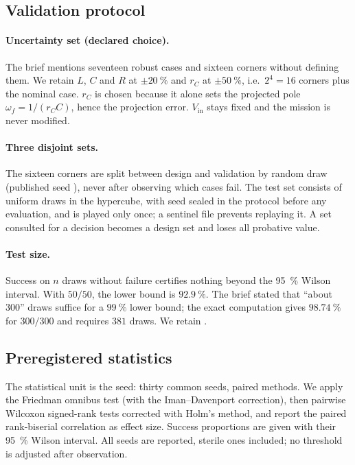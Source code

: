 \subsection{Validation protocol}

\paragraph{Uncertainty set (declared choice).}
The brief mentions seventeen robust cases and sixteen corners without
defining them. We retain $L$, $C$ and $R$ at $\pm20~\%$ and $r_C$ at
$\pm50~\%$, i.e.\ $2^4=16$ corners plus the nominal case. $r_C$ is chosen
because it alone sets the projected pole $\omega_f=1/(r_CC)$, hence the
projection error. $V_\mathrm{in}$ stays fixed and the mission is never
modified.

\paragraph{Three disjoint sets.}
The sixteen corners are split between design and validation by random draw
(published seed \ChiffreGraineSplit), never after observing which cases fail.
The test set consists of uniform draws in the hypercube, with seed
\ChiffreGraineTest{} sealed in the protocol before any evaluation, and is
played only once; a sentinel file prevents replaying it. A set consulted for a
decision becomes a design set and loses all probative value.

\paragraph{Test size.}
Success on $n$ draws without failure certifies nothing beyond the 95~\% Wilson
interval. With $50/50$, the lower bound is $92.9~\%$. The brief stated that
``about 300'' draws suffice for a $99~\%$ lower bound; the exact computation
gives $98.74~\%$ for $300/300$ and requires $381$ draws. We retain
\ChiffreNTest.

\subsection{Preregistered statistics}

The statistical unit is the seed: thirty common seeds, paired methods. We
apply the Friedman omnibus test (with the Iman--Davenport correction), then
pairwise Wilcoxon signed-rank tests corrected with Holm's method, and report
the paired rank-biserial correlation as effect size. Success proportions are
given with their 95~\% Wilson interval. All seeds are reported, sterile ones
included; no threshold is adjusted after observation.
